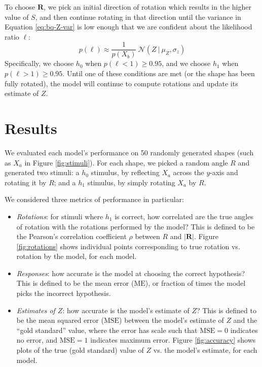 \documentclass{article} %
\newcommand{\MSE}[0]{\mathrm{MSE}}
\newcommand{\ME}[0]{\mathrm{ME}}
\begin{document}
To choose $\mathbf{R}$, we pick an initial direction of rotation which
results in the higher value of $S$, and then continue rotating in that
direction until the variance in Equation \ref{eq:bq-Z-var} is low
enough that we are confident about the likelihood ratio $\ell$:
\begin{equation*}
p(\ell)\approx\frac{1}{p(X_b)}\ \mathcal{N}(Z\ \vert\ \mu_Z, \sigma_z)
\end{equation*}
Specifically, we choose $h_0$ when $p(\ell < 1)\geq 0.95$, and we
choose $h_1$ when $p(\ell > 1)\geq 0.95$. Until one of these
conditions are met (or the shape has been fully rotated), the model
will continue to compute rotations and update its estimate of $Z$.

\section{Results}

We evaluated each model's performance on 50 randomly generated shapes
(such as $X_a$ in Figure \ref{fig:stimuli}). For each shape, we picked
a random angle $R$ and generated two stimuli: a $h_0$ stimulus, by
reflecting $X_a$ across the $y$-axis and rotating it by $R$; and a
$h_1$ stimulus, by simply rotating $X_a$ by $R$.

We considered three metrics of performance in particular:
\begin{itemize}
\item \textit{Rotations}: for stimuli where $h_1$ is correct, how
  correlated are the true angles of rotation with the rotations
  performed by the model? This is defined to be the Pearson's
  correlation coefficient $\rho$ between $R$ and $\vert
  \mathbf{R}\vert$. Figure \ref{fig:rotations} shows individual points
  corresponding to true rotation vs. rotation by the model, for each
  model.
\item \textit{Responses}: how accurate is the model at choosing the
  correct hypothesis? This is defined to be the mean error ($\ME{}$),
  or fraction of times the model picks the incorrect hypothesis.
\item \textit{Estimates of $Z$}: how accurate is the model's estimate
  of $Z$? This is defined to be the mean squared error ($\MSE{}$)
  between the model's estimate of $Z$ and the ``gold standard'' value,
  where the error has scale such that $\MSE{}=0$ indicates no error,
  and $\MSE{}=1$ indicates maximum error. Figure \ref{fig:accuracy}
  shows plots of the true (gold standard) value of $Z$ vs. the model's
  estimate, for each model.
\end{itemize}
\end{document}
